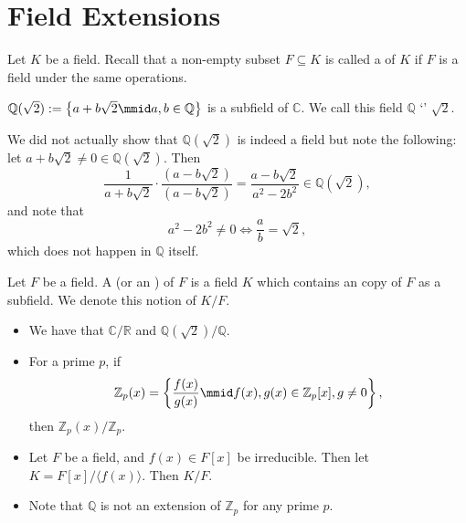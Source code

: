 \documentclass[notoc,notitlepage]{tufte-book}
\begin{document}


\section{Field Extensions}%
\label{sec:field_extensions}

Let $K$ be a field. Recall that a non-empty subset $F \subseteq K$ is called a  of $K$
if $F$ is a field under the same operations.

\begin{eg}
  $\mathbb{Q}(\sqrt{2}) := \left\{ a + b\sqrt{2} \mmid a, b \in \mathbb{Q} \right\}$ is a subfield of
  $\mathbb{C}$. We call this field $\mathbb{Q}$ `' $\sqrt{2}$.
\end{eg}

\begin{note}
  We did not actually show that $\mathbb{Q}(\sqrt{2})$ is indeed a field but note the following:
  let $a + b \sqrt{2} \neq 0 \in \mathbb{Q}(\sqrt{2})$. Then
  \begin{equation*}
    \frac{1}{a + b\sqrt{2}} \cdot \frac{(a - b\sqrt{2})}{(a - b \sqrt{2})} = \frac{a - b \sqrt{2}}{a^2 - 2b^2} \in \mathbb{Q}(\sqrt{2}),
  \end{equation*}
  and note that
  \begin{equation*}
    a^2 - 2b^2 \neq 0 \iff \frac{a}{b} = \sqrt{2},
  \end{equation*}
  which does not happen in $\mathbb{Q}$ itself.
\end{note}

\begin{defn}\label{defn:field_extension}
  Let $F$ be a field. A  (or an ) of $F$ is a field $K$
  which contains an  copy of $F$ as a subfield. We denote this notion of $K/F$.
\end{defn}

\begin{eg}
  \begin{itemize}
    \item We have that $\mathbb{C} / \mathbb{R}$ and $\mathbb{Q}(\sqrt{2}) / \mathbb{Q}$.

    \item For a prime $p$, if
      \begin{equation*}
        \mathbb{Z}_p(x) = \left\{ \frac{f(x)}{g(x)} \mmid f(x), g(x) \in
          \mathbb{Z}_p[x], g \neq 0 \right\},
      \end{equation*}
      then $\mathbb{Z}_p(x) / \mathbb{Z}_p$.

    \item Let $F$ be a field, and $f(x) \in F[x]$ be irreducible. Then let $K =
      F[x]/\langle f(x) \rangle$. Then $K / F$.

    \item Note that $\mathbb{Q}$ is not an extension of $\mathbb{Z}_p$ for any
      prime $p$.
  \end{itemize}
\end{eg}
\end{document}
